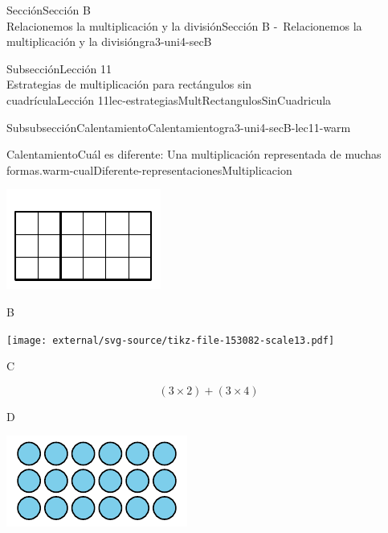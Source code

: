 \begin{sectionptx}{Sección}{{\Large Sección B\\}Relacionemos la multiplicación y la división}{}{Sección B -~Relacionemos la multiplicación y la división}{}{}{gra3-uni4-secB}
\begin{subsectionptx}{Subsección}{{\normalsize Lección 11\\[-0.05cm]}Estrategias de multiplicación para rectángulos sin\\cuadrícula}{}{Lección 11}{}{}{lec-estrategiasMultRectangulosSinCuadricula}
\begin{subsubsectionptx}{Subsubsección}{Calentamiento}{}{Calentamiento}{}{}{gra3-uni4-secB-lec11-warm}
\begin{exploration}{Calentamiento}{Cuál es diferente: Una multiplicación representada de muchas formas.}{warm-cualDiferente-representacionesMultiplicacion}
\begin{sidebyside}{2}{0.05}{0.05}{0.1}
\begin{sbspanel}{0.4}
\includegraphics[max width=\linewidth, center]{external/svg-source/tikz-file-153081.pdf}
\end{sbspanel}%
\begin{sbspanel}{0.4}%
B%
\par
\texttt{[image: external/svg-source/tikz-file-153082-scale13.pdf]}
\end{sbspanel}%
\end{sidebyside}%
\begin{sidebyside}{2}{0.05}{0.05}{0.1}%
\begin{sbspanel}{0.4}%
C%
\par
%
\begin{equation*}
(3\times 2) + (3\times 4)
\end{equation*}
%
\end{sbspanel}%
\begin{sbspanel}{0.4}%
D%
\par
\includegraphics[max width=\linewidth, center]{external/svg-source/tikz-file-153083.pdf}
\end{sbspanel}%
\end{sidebyside}%

\end{exploration}
\end{subsubsectionptx}
\end{subsectionptx}
\end{sectionptx}
